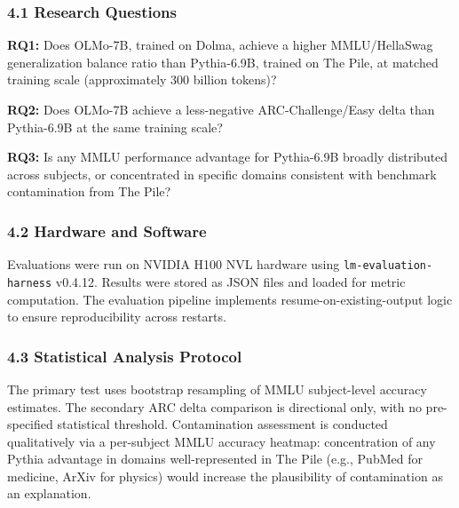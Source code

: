 
\subsubsection{4.1 Research Questions}

\textbf{RQ1:} Does OLMo-7B, trained on Dolma, achieve a higher MMLU/HellaSwag generalization balance ratio than Pythia-6.9B, trained on The Pile, at matched training scale (approximately 300 billion tokens)?

\textbf{RQ2:} Does OLMo-7B achieve a less-negative ARC-Challenge/Easy delta than Pythia-6.9B at the same training scale?

\textbf{RQ3:} Is any MMLU performance advantage for Pythia-6.9B broadly distributed across subjects, or concentrated in specific domains consistent with benchmark contamination from The Pile?

\subsubsection{4.2 Hardware and Software}

Evaluations were run on NVIDIA H100 NVL hardware using \texttt{lm-evaluation-harness} v0.4.12. Results were stored as JSON files and loaded for metric computation. The evaluation pipeline implements resume-on-existing-output logic to ensure reproducibility across restarts.

\subsubsection{4.3 Statistical Analysis Protocol}

The primary test uses bootstrap resampling of MMLU subject-level accuracy estimates. The secondary ARC delta comparison is directional only, with no pre-specified statistical threshold. Contamination assessment is conducted qualitatively via a per-subject MMLU accuracy heatmap: concentration of any Pythia advantage in domains well-represented in The Pile (e.g., PubMed for medicine, ArXiv for physics) would increase the plausibility of contamination as an explanation.

